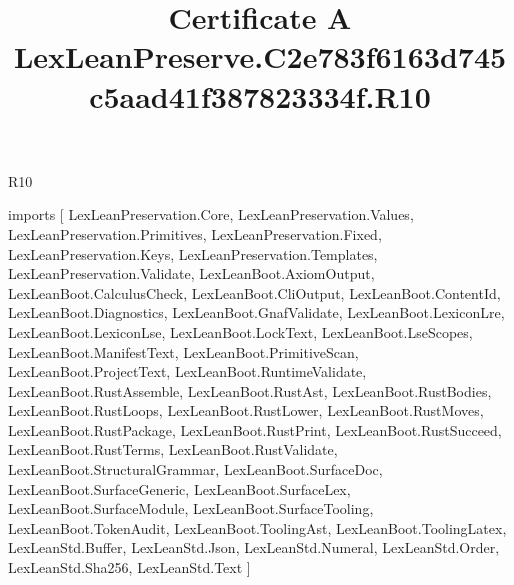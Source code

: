 \begin{lexlean}{R10}
\title{Certificate A LexLeanPreserve.C2e783f6163d745c5aad41f387823334f.R10}
\begin{coremodule}
imports [
  LexLeanPreservation.Core,
  LexLeanPreservation.Values,
  LexLeanPreservation.Primitives,
  LexLeanPreservation.Fixed,
  LexLeanPreservation.Keys,
  LexLeanPreservation.Templates,
  LexLeanPreservation.Validate,
  LexLeanBoot.AxiomOutput,
  LexLeanBoot.CalculusCheck,
  LexLeanBoot.CliOutput,
  LexLeanBoot.ContentId,
  LexLeanBoot.Diagnostics,
  LexLeanBoot.GnafValidate,
  LexLeanBoot.LexiconLre,
  LexLeanBoot.LexiconLse,
  LexLeanBoot.LockText,
  LexLeanBoot.LseScopes,
  LexLeanBoot.ManifestText,
  LexLeanBoot.PrimitiveScan,
  LexLeanBoot.ProjectText,
  LexLeanBoot.RuntimeValidate,
  LexLeanBoot.RustAssemble,
  LexLeanBoot.RustAst,
  LexLeanBoot.RustBodies,
  LexLeanBoot.RustLoops,
  LexLeanBoot.RustLower,
  LexLeanBoot.RustMoves,
  LexLeanBoot.RustPackage,
  LexLeanBoot.RustPrint,
  LexLeanBoot.RustSucceed,
  LexLeanBoot.RustTerms,
  LexLeanBoot.RustValidate,
  LexLeanBoot.StructuralGrammar,
  LexLeanBoot.SurfaceDoc,
  LexLeanBoot.SurfaceGeneric,
  LexLeanBoot.SurfaceLex,
  LexLeanBoot.SurfaceModule,
  LexLeanBoot.SurfaceTooling,
  LexLeanBoot.TokenAudit,
  LexLeanBoot.ToolingAst,
  LexLeanBoot.ToolingLatex,
  LexLeanStd.Buffer,
  LexLeanStd.Json,
  LexLeanStd.Numeral,
  LexLeanStd.Order,
  LexLeanStd.Sha256,
  LexLeanStd.Text
]


\end{coremodule}
\end{lexlean}
